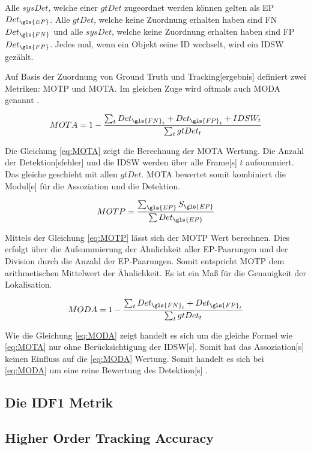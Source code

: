 Alle \(sysDet\), welche einer \(gtDet\) zugeordnet werden können gelten als \gls{EP} \(Det_{\gls{EP}}\). Alle \(gtDet\), welche keine Zuordnung erhalten haben sind \gls{FN} \(Det_{\gls{FN}}\) und alle \(sysDet\), welche keine Zuordnung erhalten haben sind \gls{FP} \(Det_{\gls{FP}}\). Jedes mal, wenn ein Objekt seine \acrshort{ID} wechselt, wird ein \gls{IDSW} gezählt. \par

Auf Basis der Zuordnung von \gls{Ground Truth} und \gls{Tracking}[ergebnis] definiert \cite{CLEAR.2008} zwei Metriken: \gls{MOTP} und \gls{MOTA}. Im gleichen Zuge wird oftmals auch \gls{MODA} genannt \cite{Kasturi.2009}. 

\begin{equation}
    \label{eq:MOTA}
    MOTA = 1-\frac{\sum_{t}Det_{\gls{FN}_{t}}+Det_{\gls{FP}_{t}}+IDSW_{t}}{\sum_{t}gtDet_t}
\end{equation}

Die Gleichung \ref{eq:MOTA} zeigt die Berechnung der \gls{MOTA} Wertung. Die Anzahl der \gls{Detektion}[sfehler] und die \gls{IDSW} werden über alle \gls{Frame}[s] \(t\) aufsummiert. Das gleiche geschieht mit allen \(gtDet\). \gls{MOTA} bewertet somit kombiniert die \gls{Modul}[e] für die \gls{Assoziation} und die \gls{Detektion}. 

\begin{equation}
    \label{eq:MOTP}
    MOTP = \frac{\sum_{\gls{EP}}S_{\gls{EP}}}{\sum Det_{\gls{EP}}}
\end{equation}

Mittels der Gleichung \ref{eq:MOTP} lässt sich der \gls{MOTP} Wert berechnen. Dies erfolgt über die Aufsummierung der Ähnlichkeit aller \gls{EP}-Paarungen und der Division durch die Anzahl der \gls{EP}-Paarungen. Somit entspricht \gls{MOTP} dem arithmetischen Mittelwert der Ähnlichkeit. Es ist ein Maß für die Genauigkeit der \gls{Lokalisation}.

\begin{equation}
    \label{eq:MODA}
    MODA =  1-\frac{\sum_{t}Det_{\gls{FN}_{t}}+Det_{\gls{FP}_{t}}}{\sum_{t}gtDet_t}
\end{equation}

Wie die Gleichung \ref{eq:MODA} zeigt handelt es sich um die gleiche Formel wie \ref{eq:MOTA} nur ohne Berücksichtigung der \gls{IDSW}[s]. Somit hat das \gls{Assoziation}[s] keinen Einfluss auf die \ref{eq:MODA} Wertung. Somit handelt es sich bei \ref{eq:MODA} um eine reine Bewertung des \gls{Detektion}[s] \cite{CLEAR.2008, HOTA, Kasturi.2009}.

\subsection{Die IDF1 Metrik}

\subsection{Higher Order Tracking Accuracy}